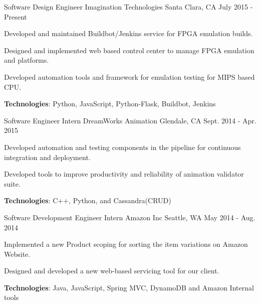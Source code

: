 \begin{cventries}
  \cventry
    {Software Design Engineer}
    {Imagination Technologies}
    {Santa Clara, CA}
    {July 2015 - Present}
    {
      \begin{cvitems}
        \item {Developed and maintained Buildbot/Jenkins service for FPGA emulation builds.}
        \item {Designed and implemented web based control center to manage FPGA emulation and platforms.}
        \item {Developed automation tools and framework for emulation testing for MIPS based CPU.}                
        \item {\textbf{Technologies}: Python, JavaScript, Python-Flask, Buildbot, Jenkins}
      \end{cvitems}
    }
  \cventry
    {Software Engineer Intern}
    {DreamWorks Animation}
    {Glendale, CA}
    {Sept. 2014 - Apr. 2015}
    {
      \begin{cvitems}
        \item {Developed automation and testing components in the pipeline for continuous integration and deployment.}
        \item {Developed tools to improve productivity and reliability of animation validator suite.}
        \item {\textbf{Technologies}: C++, Python, and Cassandra(CRUD)}
      \end{cvitems}
    }
  \cventry
    {Software Development Engineer Intern}
    {Amazon Inc}
    {Seattle, WA}
    {May 2014 - Aug. 2014}
    {
      \begin{cvitems}
        \item {Implemented a new Product scoping for sorting the item variations on Amazon Website.}
        \item {Designed and developed a new web-based servicing tool for our client.}
        \item {\textbf{Technologies}: Java, JavaScript, Spring MVC, DynamoDB and Amazon Internal tools}
      \end{cvitems} 
    }
    
\end{cventries}
